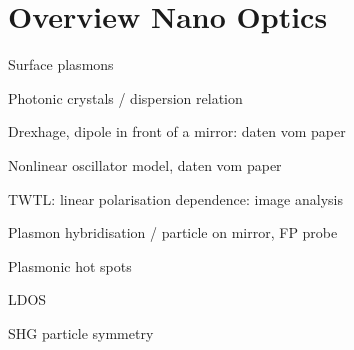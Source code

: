 \chapter{Overview Nano Optics}




Surface plasmons

Photonic crystals / dispersion relation

Drexhage, dipole in front of a mirror: daten vom paper

Nonlinear oscillator model, daten vom paper

TWTL: linear polarisation dependence: image analysis

Plasmon hybridisation / particle on mirror, FP probe



Plasmonic hot spots

LDOS

SHG particle symmetry

